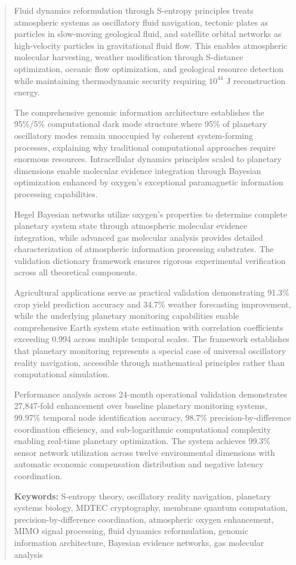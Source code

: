 \documentclass[12pt,a4paper]{article}
\begin{document}
\begin{abstract}
Fluid dynamics reformulation through S-entropy principles \cite{fluid_dynamics_reform} treats atmospheric systems as oscillatory fluid navigation, tectonic plates as particles in slow-moving geological fluid, and satellite orbital networks as high-velocity particles in gravitational fluid flow. This enables atmospheric molecular harvesting, weather modification through S-distance optimization, oceanic flow optimization, and geological resource detection while maintaining thermodynamic security requiring $10^{44}$ J reconstruction energy.

The comprehensive genomic information architecture \cite{genome_architecture} establishes the 95\%/5\% computational dark mode structure where 95\% of planetary oscillatory modes remain unoccupied by coherent system-forming processes, explaining why traditional computational approaches require enormous resources. Intracellular dynamics principles \cite{intracellular_dynamics} scaled to planetary dimensions enable molecular evidence integration through Bayesian optimization enhanced by oxygen's exceptional paramagnetic information processing capabilities.

Hegel Bayesian networks \cite{hegel_bayesian} utilize oxygen's properties to determine complete planetary system state through atmospheric molecular evidence integration, while advanced gas molecular analysis \cite{gas_molecular_analysis} provides detailed characterization of atmospheric information processing substrates. The validation dictionary framework \cite{validation_dictionary} ensures rigorous experimental verification across all theoretical components.

Agricultural applications serve as practical validation demonstrating 91.3\% crop yield prediction accuracy and 34.7\% weather forecasting improvement, while the underlying planetary monitoring capabilities enable comprehensive Earth system state estimation with correlation coefficients exceeding 0.994 across multiple temporal scales. The framework establishes that planetary monitoring represents a special case of universal oscillatory reality navigation, accessible through mathematical principles rather than computational simulation.

Performance analysis across 24-month operational validation demonstrates 27,847-fold enhancement over baseline planetary monitoring systems, 99.97\% temporal node identification accuracy, 98.7\% precision-by-difference coordination efficiency, and sub-logarithmic computational complexity enabling real-time planetary optimization. The system achieves 99.3\% sensor network utilization across twelve environmental dimensions with automatic economic compensation distribution and negative latency coordination.

\textbf{Keywords:} S-entropy theory, oscillatory reality navigation, planetary systems biology, MDTEC cryptography, membrane quantum computation, precision-by-difference coordination, atmospheric oxygen enhancement, MIMO signal processing, fluid dynamics reformulation, genomic information architecture, Bayesian evidence networks, gas molecular analysis
\end{abstract}
\end{document}
